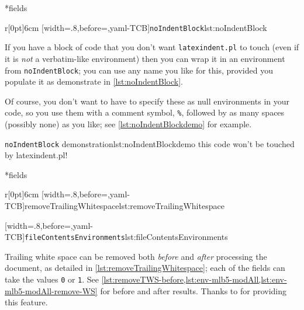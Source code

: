 *{fields}

	\begin{wrapfigure}[8]{r}[0pt]{6cm}
		[width=.8\linewidth,before=\centering,yaml-TCB]{\texttt{noIndentBlock}}{lst:noIndentBlock}
	\end{wrapfigure}
	If you have a block of code that you don't want \texttt{latexindent.pl} to touch (even if it is \emph{not} a verbatim-like
	environment) then you can wrap it in an environment from \texttt{noIndentBlock};
	you can use any name you like for this, provided you populate it as demonstrate in
	\cref{lst:noIndentBlock}.

	Of course, you don't want to have to specify these as null environments
	in your code, so you use them with a comment symbol, \lstinline!%!, followed
	by as many spaces (possibly none) as you like; see \cref{lst:noIndentBlockdemo} for
	example.

	\begin{cmhlistings}[style=demo,escapeinside={(*@}{@*)}]{\texttt{noIndentBlock} demonstration}{lst:noIndentBlockdemo}
        this code
                won't
     be touched
                    by
             latexindent.pl!
	\end{cmhlistings}

*{fields}\label{yaml:removeTrailingWhitespace}

	\begin{wrapfigure}[12]{r}[0pt]{6cm}
		[width=.8\linewidth,before=\centering,yaml-TCB]{removeTrailingWhitespace}{lst:removeTrailingWhitespace}

		\vspace{.2cm}
		[width=.8\linewidth,before=\centering,yaml-TCB]{\texttt{fileContentsEnvironments}}{lst:fileContentsEnvironments}
	\end{wrapfigure}
	Trailing white space can be removed both \emph{before} and \emph{after} processing
	the document, as detailed in \cref{lst:removeTrailingWhitespace}; each of the fields
	can take the values \texttt{0} or \texttt{1}. See \vref{lst:removeTWS-before,lst:env-mlb5-modAll,lst:env-mlb5-modAll-remove-WS}
	for before and after results.  Thanks to \cite{vosskuhle} for providing this feature.

